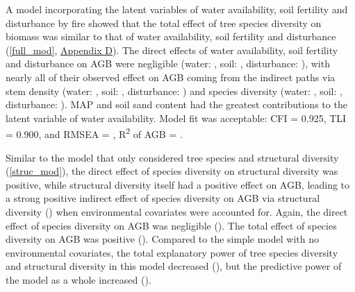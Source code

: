 \documentclass[11pt,a4paper]{article}
\begin{document}
A model incorporating the latent variables of water availability, soil fertility and disturbance by fire showed that the total effect of tree species diversity on biomass was similar to that of water availability, soil fertility and disturbance (\autoref{full_mod}, \hyperref[appendixd]{Appendix D}). The direct effects of water availability, soil fertility and disturbance on AGB were negligible (water: \fmbetamb{}, soil: \fmbetasb{}, disturbance: \fmbetafb{}), with nearly all of their observed effect on AGB coming from the indirect paths via stem density (water: \fmbetamib{}, soil: \fmbetasib{}, disturbance: \fmbetafib{}) and species diversity (water: \fmbetamd{}, soil: \fmbetasd{}, disturbance: \fmbetafd{}). MAP and soil sand content had the greatest contributions to the latent variable of water availability. Model fit was acceptable: CFI = 0.925, TLI = 0.900, and RMSEA = \fmrmsea{}, R\textsuperscript{2} of AGB = \fmrsq{}. 

Similar to the model that only considered tree species and structural diversity (\autoref{struc_mod}), the direct effect of species diversity on structural diversity was positive, while structural diversity itself had a positive effect on AGB, leading to a strong positive indirect effect of species diversity on AGB via structural diversity (\fmbetadhb{}) when environmental covariates were accounted for. Again, the direct effect of species diversity on AGB was negligible (\fmbetadb{}). The total effect of species diversity on AGB was positive (\fmbetatotaldb{}). Compared to the simple model with no environmental covariates, the total explanatory power of tree species diversity and structural diversity in this model decreased (), but the predictive power of the model as a whole increased ().
\end{document}
